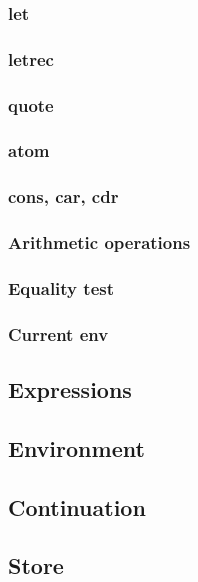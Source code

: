 \documentclass[10pt, english]{article}
\begin{document}
\subsubsection{let}

\subsubsection{letrec}

\subsubsection{quote}

\subsubsection{atom}

\subsubsection{cons, car, cdr}

\subsubsection{Arithmetic operations}

\subsubsection{Equality test}

\subsubsection{Current env}


\subsection{Expressions}

\subsection{Environment}

\subsection{Continuation}

\subsection{Store}
\end{document}
